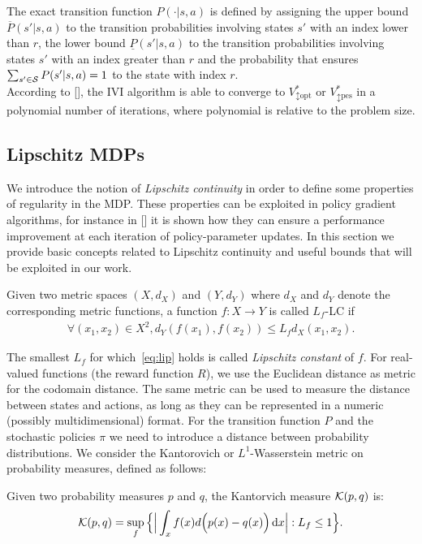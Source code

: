 The exact transition function $P(\cdot|s,a)$ is defined by assigning the upper bound $\overline{P}(s'|s,a)$ to the transition probabilities involving states $s'$ with an index lower than $r$, the lower bound $\underline{P}(s'|s,a)$ to the transition probabilities involving states $s'$ with an index greater than $r$ and the probability that ensures $\sum_{s' \in \mathcal{S}}P(s'|s,a) = 1$ to the state with index $r$.\\
\newline
According to [\cite{givan2000bounded}], the \ac{IVI} algorithm is able to converge to $V^{*}_{\updownarrow \text{opt}}$ or $V^{*}_{\updownarrow \text{pes}}$ in a polynomial number of iterations, where polynomial is relative to the problem size.

\subsection{Lipschitz \ac{MDPs}} \label{sub:lipmdp}
We introduce the notion of \emph{Lipschitz continuity} in order to define some properties of regularity in the \ac{MDP}. These properties can be exploited in policy gradient algorithms, for instance in [\cite{pirotta2015policy}] it is shown how they can ensure a performance improvement at each iteration of policy-parameter updates. In this section we provide basic concepts related to Lipschitz continuity and useful bounds that will be exploited in our work.
\begin{definition}
Given two metric spaces $(X, d_X)$ and $(Y, d_Y)$ where $d_X$ and $d_Y$ denote the corresponding metric functions, a function $f: X \rightarrow Y$ is called $L_f$-\acf{LC} if
\begin{align} \forall(x_1, x_2) \in X^2, d_Y(f(x_1), f(x_2)) \leq L_f d_X(x_1, x_2). \label{eq:lip} \end{align}
\end{definition}
\noindent The smallest $L_f$ for which~\eqref{eq:lip} holds is called \emph{Lipschitz constant} of $f$. For real-valued functions (\eg the reward function $R$), we use the Euclidean distance as metric for the codomain distance. The same metric can be used to measure the distance between states and actions, as long as they can be represented in a numeric (possibly multidimensional) format. For the transition function $P$ and the stochastic policies $\pi$ we need to introduce a distance between probability distributions. We consider the Kantorovich or $L^1$-Wasserstein metric on probability measures, defined as follows:
\begin{definition}
Given two probability measures $p$ and $q$, the Kantorvich measure $\mathcal{K}(p, q)$ is:
\begin{align} \mathcal{K}(p, q) = \sup_f\Big\{ \Big| \int_x f(x) d\Big(p(x)-q(x)\Big) \,\mathrm{d} x \Big|: L_f \leq 1 \Big\}. \label{eq:kant}\end{align}
\end{definition}
